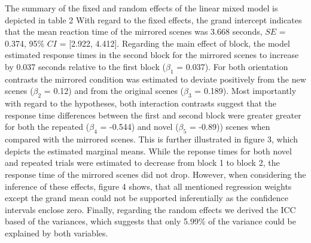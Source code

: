 \documentclass[
  man,floatsintext]{apa7}
\begin{document}
The summary of the fixed and random effects of the linear mixed model is depicted in table 2 With regard to the fixed effects, the grand intercept indicates that the mean reaction time of the mirrored scenes was 3.668 seconds, \(SE\) = 0.374, 95\% \(CI\) = {[}2.922, 4.412{]}. Regarding the main effect of block, the model estimated response times in the second block for the mirrored scenes to increase by 0.037 seconds relative to the first block (\(\beta_1\) = 0.037). For both orientation contrasts the mirrored condition was estimated to deviate positively from the new scenes (\(\beta_2\) = 0.12) and from the original scenes (\(\beta_3\) = 0.189). Most importantly with regard to the hypotheses, both interaction contrasts suggest that the response time differences between the first and second block were greater greater for both the repeated (\(\beta_4\) = -0.544) and novel (\(\beta_5\) = -0.89)) scenes when compared with the mirrored scenes. This is further illustrated in figure 3, which depicts the estimated marginal means. While the reponse times for both novel and repeated trials were estimated to decrease from block 1 to block 2, the response time of the mirrored scenes did not drop. However, when considering the inference of these effects, figure 4 shows, that all mentioned regression weights except the grand mean could not be supported inferentially as the confidence intervals enclose zero. Finally, regarding the random effects we derived the ICC based of the variances, which suggests that only 5.99\% of the variance could be explained by both variables.
\end{document}
